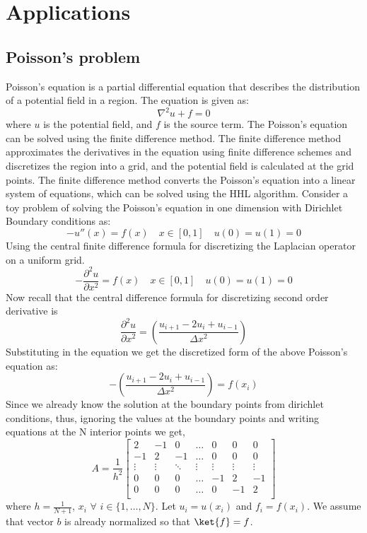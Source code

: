 \documentclass[12pt, oneside]{book}
\theoremstyle{definition}
\theoremstyle{definition}
\theoremstyle{remark}
\begin{document}
\section{Applications}
\subsection{Poisson's problem}
Poisson's equation is a partial differential equation that describes the distribution of a potential field in a region. The equation is given as:
\[
\nabla^2 u+f=0
\]
where $u$ is the potential field, and $f$ is the source term. The Poisson's equation can be solved using the finite difference method. The finite difference method approximates the derivatives in the equation using finite difference schemes and discretizes the region into a grid, and the potential field is calculated at the grid points. The finite difference method converts the Poisson's equation into a linear system of equations, which can be solved using the HHL algorithm.
Consider a toy problem of solving the Poisson's equation in one dimension with Dirichlet Boundary conditions as:
\[
    -u''(x)=f(x) \quad x \in [0,1] \quad u(0)=u(1)=0
\]
Using the central finite difference formula for discretizing the Laplacian operator on a uniform grid.
\[
    -\frac{\partial^2 u}{\partial x^2}=f(x) \quad x \in [0,1] \quad u(0)=u(1)=0
\]
Now recall that the central difference formula for discretizing second order derivative is
\[
    \frac{\partial^2 u}{\partial x^2} =\left(\frac{u_{i+1} -2u_{i} + u_{i-1}}{\Delta x^2}\right)
\]
Substituting in the equation we get the discretized form of the above Poisson's equation as:
\[
    -\left(\frac{u_{i+1} -2u_{i} + u_{i-1}}{\Delta x^2}\right)=f(x_i)
\]
Since we already know the solution at the boundary points from dirichlet conditions, thus, ignoring the values at the boundary points and writing equations at the N interior points we get,
\[
A=\frac{1}{h^2}\begin{bmatrix} 2 & -1 & 0 & \ldots & 0 & 0 & 0 \\ -1 & 2 & -1 &\ldots &0 & 0 & 0\\
\vdots & \vdots & \ddots & \vdots & \vdots & \vdots & \vdots \\
0 & 0  & 0 &\ldots & -1 & 2 & -1 \\
0 & 0 & 0 & \ldots & 0 & -1 & 2 \\
\end{bmatrix}
\]
where $h=\frac{1}{N+1}$, $x_i$ $\forall$ $i \in \{1,\ldots,N\}$. Let $u_i=u(x_i)$ and $f_i=f(x_i)$. We assume that vector $b$ is already normalized so that $\ket{f}=f$.
\end{document}
